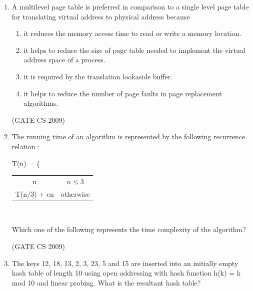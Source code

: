 \documentclass[a4paper, 11pt]{article}
\begin{document}
\begin{enumerate}
    \item A multilevel page table is preferred in comparison to a single level page table for translating virtual address to physical address because
    \begin{enumerate} 
        \item  it reduces the memory access time to read or write a memory location.
        \item it helps to reduce the size of page table needed to implement the virtual address space of a process. 
        \item it is required by the translation lookaside buffer.
        \item it helps to reduce the number of page faults in page replacement algorithms.
    \end{enumerate}

    \hfill (GATE CS 2009)

    \item The running time of an algorithm is represented by the following recurrence relation :\\
    
    \begin{center}
        T(n) = $\Biggl\{$
        \begin{tabular}{cc}
        n & $n \leq3$\\
        T(n/3) + cn & otherwise
        \end{tabular}\\
    \end{center}

    Which one of the following represents the time complexity of the algorithm?
    \begin{enumerate}
    \end{enumerate}

    \hfill (GATE CS 2009)

    \item  The keys 12, 18, 13, 2, 3, 23, 5 and 15 are inserted into an initially empty hash table of length 10 using open addressing with hash function h(k) = k mod 10 and linear probing. What is the resultant hash table?
    \begin{enumerate}
        \begin{multicols}{4}
        

\end{multicols}
\end{enumerate}
\end{enumerate}
\end{document}
